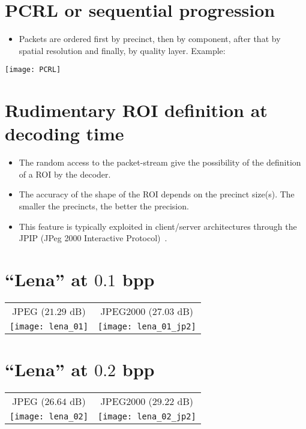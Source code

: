 \section*{PCRL or sequential progression}
\begin{itemize}
\item Packets are ordered first by precinct, then by component, after
  that by spatial resolution and finally, by quality layer. Example:
\end{itemize}
\begin{center}
\texttt{[image: PCRL]}
\end{center}

\section*{Rudimentary ROI definition at decoding time}
\begin{itemize}
\item The random access to the packet-stream give the possibility of
  the definition of a ROI by the decoder.
\item The accuracy of the shape of the ROI depends on the precinct
  size(s). The smaller the precincts, the better the precision.
\item This feature is typically exploited in client/server
  architectures through the JPIP (JPeg 2000 Interactive
  Protocol)~\cite{JPIP}.
\end{itemize}

\section*{``Lena'' at $0.1$ bpp}
\begin{center}
  \begin{tabular}{cc}
    JPEG ($21.29$ dB) & JPEG2000 ($27.03$ dB) \\
    \texttt{[image: lena\_01]} &
    \texttt{[image: lena\_01\_jp2]}
  \end{tabular}
\end{center}


\section*{``Lena'' at $0.2$ bpp}
\begin{center}
  \begin{tabular}{cc}
    JPEG ($26.64$ dB) & JPEG2000 ($29.22$ dB) \\
    \texttt{[image: lena\_02]} &
    \texttt{[image: lena\_02\_jp2]}
  \end{tabular}
\end{center}

